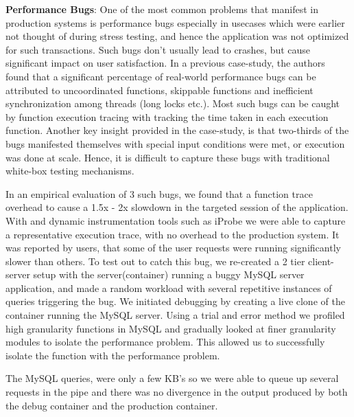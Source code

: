 \textbf{Performance Bugs}: One of the most common problems that manifest in production systems is performance bugs especially in usecases which were earlier not thought of during stress testing, and hence the application was not optimized for such transactions.
Such bugs don't usually lead to crashes, but cause significant impact on user satisfaction.
In a previous case-study\cite{shanluPerf}, the authors found that a significant percentage of real-world performance bugs can be attributed to uncoordinated functions, skippable functions and inefficient synchronization among threads (long locks etc.).
Most such bugs can be caught by function execution tracing with tracking the time taken in each execution function.
Another key insight provided in the case-study, is that two-thirds of the bugs manifested themselves with special input conditions were met, or execution was done at scale. Hence, it is difficult to capture these bugs with traditional white-box testing mechanisms.

In an empirical evaluation of 3 such bugs, we found that a function trace overhead to cause a 1.5x - 2x slowdown in the targeted session of the application. 
With \parikshan and dynamic instrumentation tools such as iProbe\cite{iProbe} we were able to capture a representative execution trace, with no overhead to the production system.
It was reported by users, that some of the user requests were running significantly slower than others.
To test out \parikshan to catch this bug, we re-created a 2 tier client-server setup with the server(container) running a buggy MySQL server application, and made a random workload with several repetitive instances of queries triggering the bug.
We initiated debugging by creating a live clone of the container running the MySQL server.
Using a trial and error method we profiled high granularity functions in MySQL and gradually looked at finer granularity modules to isolate the performance problem.
This allowed us to successfully isolate the function with the performance problem.


The MySQL queries, were only a few KB's so we were able to queue up several requests in the pipe and there was no divergence in the output produced by both the debug container and the production container. 



